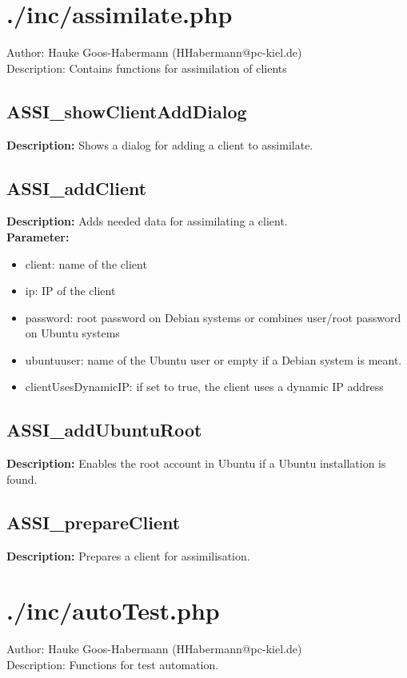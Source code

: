 
\newpage\section{./inc/assimilate.php}
 Author: Hauke Goos-Habermann (HHabermann@pc-kiel.de)\\
 Description: Contains functions for assimilation of clients\\

\subsection{ASSI\_showClientAddDialog}
\textbf{Description:} Shows a dialog for adding a client to assimilate.\\

\subsection{ASSI\_addClient}
\textbf{Description:} Adds needed data for assimilating a client.\\
\textbf{Parameter:}
\begin{itemize}
\item client: name of the client
\item ip: IP of the client
\item password: root password on Debian systems or combines user/root password on Ubuntu systems
\item ubuntuuser: name of the Ubuntu user or empty if a Debian system is meant.
\item clientUsesDynamicIP: if set to true, the client uses a dynamic IP address
\end{itemize}

\subsection{ASSI\_addUbuntuRoot}
\textbf{Description:} Enables the root account in Ubuntu if a Ubuntu installation is found.\\

\subsection{ASSI\_prepareClient}
\textbf{Description:} Prepares a client for assimilisation.\\

\newpage\section{./inc/autoTest.php}
 Author: Hauke Goos-Habermann (HHabermann@pc-kiel.de)\\
 Description: Functions for test automation.\\

